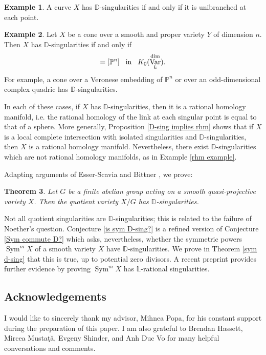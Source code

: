 \documentclass{amsart}
\newtheorem{thm}{Theorem}[section]
\theoremstyle{definition}
\newtheorem{exmp}[thm]{Example}
\DeclareMathOperator{\Sym}{Sym}
\DeclareMathOperator{\Var}{Var}
\newcommand{\Kdim}{K_0(\Var_k^{\dim})}
\numberwithin{equation}{section}
\begin{document}
\begin{exmp}
A curve $X$ has $\mathbb{D}$-singularities if and only if it is unibranched at each point.
\end{exmp}

\begin{exmp}
Let $X$ be a cone over a smooth and proper variety $Y$ of dimension $n$. Then $X$ has $\mathbb{D}$-singularities if and only if
\begin{align*}
    [Y] = [\mathbb{P}^n] \hspace{.3cm} \text{in} \hspace{.3cm} \Kdim.
\end{align*}
For example, a cone over a Veronese embedding of $\mathbb{P}^n$ or over an odd-dimensional complex quadric has $\mathbb{D}$-singularities.
\end{exmp}

In each of these cases, if $X$ has $\mathbb{D}$-singularities, then it is a rational homology manifold, i.e. the rational homology of the link at each singular point is equal to that of a sphere. More generally, Proposition \ref{D-sing implies rhm} shows that if $X$ is a local complete intersection with isolated singularities and $\mathbb{D}$-singularities, then $X$ is a rational homology manifold. Nevertheless, there exist $\mathbb{D}$-singularities which are not rational homology manifolds, as in Example \ref{rhm example}.

Adapting arguments of Esser-Scavia \cite{esserquotient} and Bittner \cite{bittnertoric}, we prove:

\begin{thm}\label{intro abelian quot}
Let $G$ be a finite abelian group acting on a smooth quasi-projective variety $X$. Then the quotient variety $X/G$ has $\mathbb{D}$-singularities. 
\end{thm}

Not all quotient singularities are $\mathbb{D}$-singularities; this is related to the failure of Noether's question. Conjecture \ref{is sym D-sing?} is a refined version of Conjecture \ref{Sym commute D?} which asks, nevertheless, whether the symmetric powers $\Sym^m X$ of a smooth variety $X$ have $\mathbb{D}$-singularities. We prove in Theorem \ref{sym d-sing} that this is true, up to potential zero divisors. A recent preprint \cite{shein} provides further evidence by proving $\Sym^m X$ has $\mathbb{L}$-rational singularities.



\subsection*{Acknowledgements}
I would like to sincerely thank my advisor, Mihnea Popa, for his constant support during the preparation of this paper. I am also grateful to Brendan Hassett, Mircea Musta{\c{t}}{\u{a}}, Evgeny Shinder, and Anh Duc Vo for many helpful conversations and comments.
\end{document}

